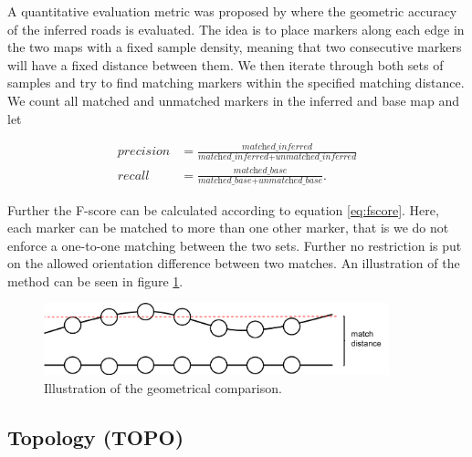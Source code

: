 A quantitative evaluation metric was proposed by \cite{biagioni:gis12} where the geometric accuracy of the inferred roads is evaluated. The idea is to place markers along each edge in the two maps with a fixed sample density, meaning that two consecutive markers will have a fixed distance between them. We then iterate through both sets of samples and try to find matching markers within the specified matching distance. We count all matched and unmatched markers in the inferred and base map and let

\begin{equation}
    \begin{split}
        precision &= \frac{\textit{matched\_inferred}}{\textit{matched\_inferred} + \textit{unmatched\_inferred}} \\ 
        recall &= \frac{\textit{matched\_base}}{\textit{matched\_base} + \textit{unmatched\_base}}.
\end{split}
\end{equation}

Further the F-score can be calculated according to equation \ref{eq:fscore}. Here, each marker can be matched to more than one other marker, that is we do not enforce a one-to-one matching between the two sets. Further no restriction is put on the allowed orientation difference between two matches. An illustration of the method can be seen in figure \ref{fig:method/comp_geo}.

\begin{figure}[H]
    \centering
    \includegraphics[width=10cm]{Figures/Method/geo.png}
    \caption{Illustration of the geometrical comparison.}
    \label{fig:method/comp_geo}
\end{figure}



\subsection{Topology (TOPO)}
\label{chp:method.sec:evaluation.sub:topo}

